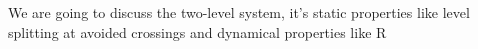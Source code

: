 We are going to discuss the two-level system, it's static properties like level splitting at avoided crossings and dynamical properties like R